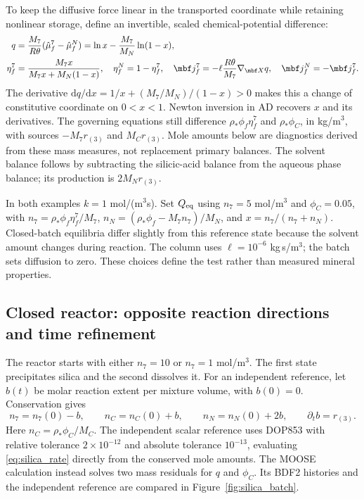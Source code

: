 \documentclass[11pt]{article}
\begin{document}
To keep the diffusive force linear in the transported coordinate while retaining nonlinear storage, define an invertible, scaled chemical-potential difference:
\begin{align}
 q&=\frac{M_7}{R\theta}(\hat\mu_f^7-\hat\mu_f^N)
 =\ln x-\frac{M_7}{M_N}\ln(1-x),\label{eq:silica_coordinate}\\
 \eta_f^7&=\frac{M_7x}{M_7x+M_N(1-x)},
 \quad \eta_f^N=1-\eta_f^7,
 \quad \mbf j_f^7=-\ell\frac{R\theta}{M_7}\nabla_{\mbf X}q,
 \quad \mbf j_f^N=-\mbf j_f^7.
 \label{eq:silica_diffusion}
\end{align}
The derivative \(\mathrm dq/\mathrm dx=1/x+(M_7/M_N)/(1-x)>0\) makes this a change of constitutive coordinate on \(0<x<1\). Newton inversion in AD recovers \(x\) and its derivatives. The governing equations still difference \(\rho_*\phi_f\eta_f^7\) and \(\rho_*\phi_C\), in kg/m\(^3\), with sources \(-M_7r_{(3)}\) and \(M_Cr_{(3)}\). Mole amounts below are diagnostics derived from these mass measures, not replacement primary balances. The solvent balance follows by subtracting the silicic-acid balance from the aqueous phase balance; its production is \(2M_Nr_{(3)}\).

In both examples \(k=1\) mol/(m\(^3\)s). Set \(Q_{\rm eq}\) using \(n_7=5\) mol/m\(^3\) and \(\phi_C=0.05\), with \(n_7=\rho_*\phi_f\eta_f^7/M_7\), \(n_N=(\rho_*\phi_f-M_7n_7)/M_N\), and \(x=n_7/(n_7+n_N)\). Closed-batch equilibria differ slightly from this reference state because the solvent amount changes during reaction. The column uses \(\ell=10^{-6}\) kg\,s/m\(^3\); the batch sets diffusion to zero. These choices define the test rather than measured mineral properties.

\subsection{Closed reactor: opposite reaction directions and time refinement}
The reactor starts with either \(n_7=10\) or \(n_7=1\) mol/m\(^3\). The first state precipitates silica and the second dissolves it. For an independent reference, let \(b(t)\) be molar reaction extent per mixture volume, with \(b(0)=0\). Conservation gives
\begin{equation}
 n_7=n_7(0)-b,\qquad n_C=n_C(0)+b,
 \qquad n_N=n_N(0)+2b,\qquad \partial_tb=r_{(3)}.
 \label{eq:silica_extent}
\end{equation}
Here \(n_C=\rho_*\phi_C/M_C\). The independent scalar reference uses DOP853 with relative tolerance \(2\times10^{-12}\) and absolute tolerance \(10^{-13}\), evaluating \eqref{eq:silica_rate} directly from the conserved mole amounts. The MOOSE calculation instead solves two mass residuals for \(q\) and \(\phi_C\). Its BDF2 histories and the independent reference are compared in Figure~\ref{fig:silica_batch}.
\end{document}

